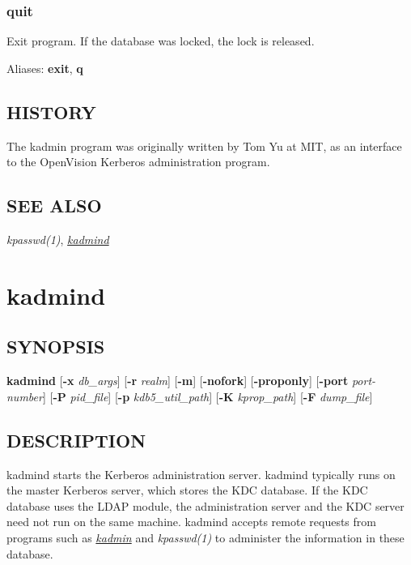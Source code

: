 \documentclass[letterpaper,10pt,english]{sphinxmanual}
\begin{document}
\subsubsection{quit}
\label{admin/admin_commands/kadmin_local:quit}
Exit program.  If the database was locked, the lock is released.

Aliases: \textbf{exit}, \textbf{q}


\subsection{HISTORY}
\label{admin/admin_commands/kadmin_local:history}
The kadmin program was originally written by Tom Yu at MIT, as an
interface to the OpenVision Kerberos administration program.


\subsection{SEE ALSO}
\label{admin/admin_commands/kadmin_local:see-also}
\emph{kpasswd(1)}, {\hyperref[admin/admin_commands/kadmind:kadmind-8]{\emph{kadmind}}}


\section{kadmind}
\label{admin/admin_commands/kadmind:kadmind-8}\label{admin/admin_commands/kadmind:kadmind}\label{admin/admin_commands/kadmind::doc}

\subsection{SYNOPSIS}
\label{admin/admin_commands/kadmind:synopsis}
\textbf{kadmind}
{[}\textbf{-x} \emph{db\_args}{]}
{[}\textbf{-r} \emph{realm}{]}
{[}\textbf{-m}{]}
{[}\textbf{-nofork}{]}
{[}\textbf{-proponly}{]}
{[}\textbf{-port} \emph{port-number}{]}
{[}\textbf{-P} \emph{pid\_file}{]}
{[}\textbf{-p} \emph{kdb5\_util\_path}{]}
{[}\textbf{-K} \emph{kprop\_path}{]}
{[}\textbf{-F} \emph{dump\_file}{]}


\subsection{DESCRIPTION}
\label{admin/admin_commands/kadmind:description}
kadmind starts the Kerberos administration server.  kadmind typically
runs on the master Kerberos server, which stores the KDC database.  If
the KDC database uses the LDAP module, the administration server and
the KDC server need not run on the same machine.  kadmind accepts
remote requests from programs such as {\hyperref[admin/admin_commands/kadmin_local:kadmin-1]{\emph{kadmin}}} and
\emph{kpasswd(1)} to administer the information in these database.
\end{document}
